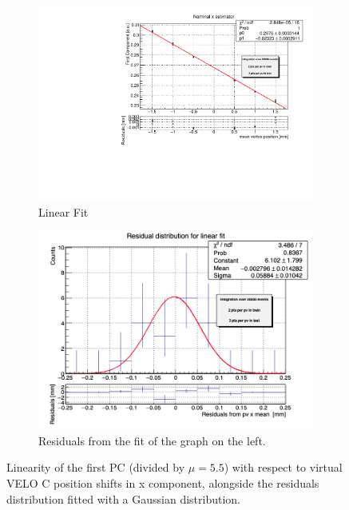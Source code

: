 \begin{figure}
    \centering
    \begin{subfigure}{0.48\textwidth}
    \includegraphics[width=\linewidth]{figures/x_fit_veloC_MC_normalised.pdf}
    \caption{Linear Fit}\label{fig:x_veloC_fit_MC}
    \end{subfigure}
    \begin{subfigure}{0.48\textwidth}
    \includegraphics[width=\linewidth]{figures/x_res_veloC_MC.png}
    \caption{Residuals from the fit of the graph on the left. }\label{fig:x_veloC_res_MC}
    \end{subfigure}
    \caption{Linearity of the first PC (divided by $\mu=5.5$) with respect to  virtual VELO C position shifts in x component, alongside the residuals distribution fitted with a Gaussian distribution.}
    \label{fig:x_veloC_MC}
\end{figure}
